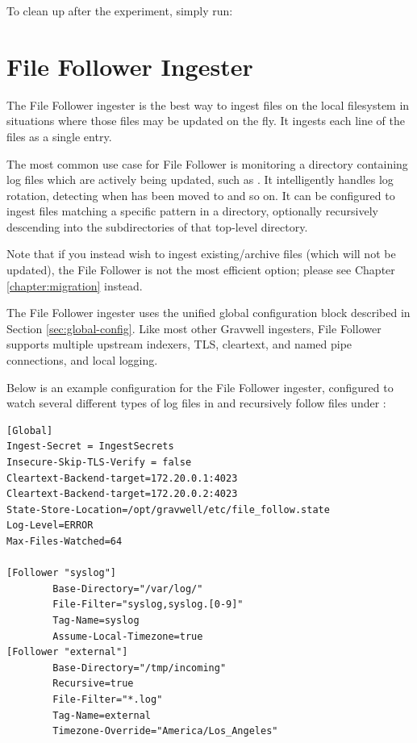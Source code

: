 To clean up after the experiment, simply run:


\clearpage
\section{File Follower Ingester}
The File Follower ingester is the best way to ingest files on the local
filesystem in situations where those files may be updated on the fly. It
ingests each line of the files as a single entry.

The most common use case for File Follower is monitoring a directory
containing log files which are actively being updated, such
as . It intelligently handles log rotation, detecting when
 has been moved to  and so on. It can be configured to
ingest files matching a specific pattern in a directory, optionally
recursively descending into the subdirectories of that top-level
directory.

Note that if you instead wish to ingest existing/archive files (which will not be updated), the File Follower is not the most efficient option; please see Chapter \ref{chapter:migration} instead.

The File Follower ingester uses the unified global configuration block
described in Section \ref{sec:global-config}. Like most other Gravwell ingesters,
File Follower supports multiple upstream indexers, TLS, cleartext, and
named pipe connections, and local logging.

Below is an example configuration for the File Follower ingester,
configured to watch several different types of log files in
 and recursively follow files under :

\begin{Verbatim}[breaklines=true]
[Global]
Ingest-Secret = IngestSecrets
Insecure-Skip-TLS-Verify = false
Cleartext-Backend-target=172.20.0.1:4023
Cleartext-Backend-target=172.20.0.2:4023
State-Store-Location=/opt/gravwell/etc/file_follow.state
Log-Level=ERROR
Max-Files-Watched=64

[Follower "syslog"]
        Base-Directory="/var/log/"
        File-Filter="syslog,syslog.[0-9]" 
        Tag-Name=syslog
        Assume-Local-Timezone=true
[Follower "external"]
        Base-Directory="/tmp/incoming"
        Recursive=true
        File-Filter="*.log"
        Tag-Name=external
        Timezone-Override="America/Los_Angeles"
\end{Verbatim}

